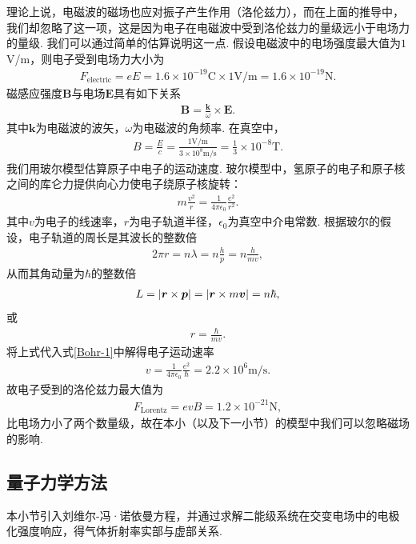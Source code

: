 \documentclass{assignment}
\begin{document}
理论上说，电磁波的磁场也应对振子产生作用（洛伦兹力），而在上面的推导中，我们却忽略了这一项，这是因为电子在电磁波中受到洛伦兹力的量级远小于电场力的量级. 我们可以通过简单的估算说明这一点. 假设电磁波中的电场强度最大值为$1$V/m，则电子受到电场力大小为
\begin{align}
    F_{\text{electric}}=eE=1.6\times 10^{-19}\text{C}\times 1\text{V/m}=1.6\times 10^{-19}\text{N}.
\end{align}
磁感应强度$\bm{B}$与电场$\bm{E}$具有如下关系
\begin{align}
    \bm{B}=\frac{\bm{k}}{\omega}\times\bm{E}.
\end{align}
其中$\bm{k}$为电磁波的波矢，$\omega$为电磁波的角频率.
在真空中，
\begin{align}
    B=\frac{E}{c}=\frac{1\text{V/m}}{3\times 10^8\text{m/s}}=\frac{1}{3}\times 10^{-8}\text{T}.
\end{align}
我们用玻尔模型估算原子中电子的运动速度. 玻尔模型中，氢原子的电子和原子核之间的库仑力提供向心力使电子绕原子核旋转：
\begin{align}
    \label{Bohr-1}
    m\frac{v^2}{r}=\frac{1}{4\pi\epsilon_0}\frac{e^2}{r^2}.
\end{align}
其中$v$为电子的线速率，$r$为电子轨道半径，$\epsilon_0$为真空中介电常数. 根据玻尔的假设，电子轨道的周长是其波长的整数倍
\begin{align}
    2\pi r=n\lambda=n\frac{h}{p}=n\frac{h}{mv},
\end{align}
从而其角动量为$\hbar$的整数倍
\begin{align}
    L=\left\lvert\bm{r}\times\bm{p}\right\rvert=\left\lvert\bm{r}\times m\bm{v}\right\rvert=n\hbar,
\end{align}
或
\begin{align}
    r=\frac{\hbar}{mv}.
\end{align}
将上式代入式\eqref{Bohr-1}中解得电子运动速率
\begin{align}
    v=\frac{1}{4\pi\epsilon_0}\frac{e^2}{\hbar}=2.2\times 10^6\text{m/s}.
\end{align}
故电子受到的洛伦兹力最大值为
\begin{align}
    F_{\text{Lorentz}}=evB=1.2\times 10^{-21}\text{N},
\end{align}
比电场力小了两个数量级，故在本小（以及下一小节）的模型中我们可以忽略磁场的影响.

\subsection{量子力学方法}
本小节引入刘维尔-冯·诺依曼方程，并通过求解二能级系统在交变电场中的电极化强度响应，得气体折射率实部与虚部关系.
\end{document}
